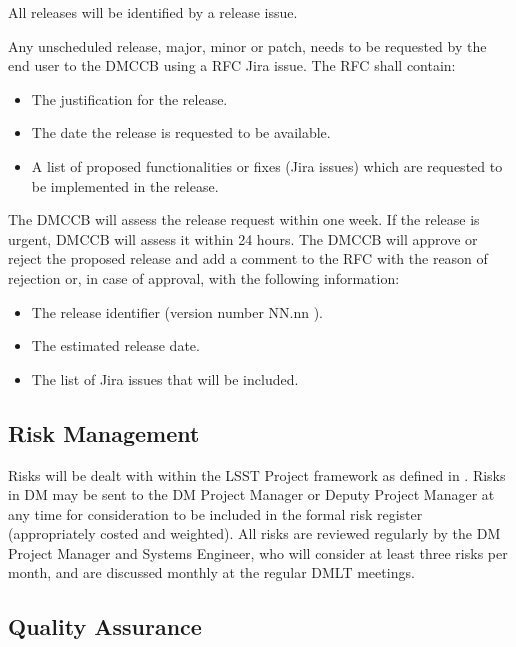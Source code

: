 All releases will be identified by a release issue.

Any unscheduled release, major, minor or \gls{patch}, needs to be requested by the end user to the \gls{DMCCB} using a \gls{RFC} Jira issue. The \gls{RFC} shall contain:

\begin{itemize}
\item The justification for the release.
\item The date the release is requested to be available.
\item A list of proposed functionalities or fixes (Jira issues) which are requested to be implemented in the release.
\end{itemize}

The \gls{DMCCB} will assess the release request within one week. If the release is urgent, \gls{DMCCB} will assess it within 24 hours.
The \gls{DMCCB} will approve or reject the proposed release and add a comment to the \gls{RFC} with the reason of rejection or, in case of approval, with the following information:

\begin{itemize}
\item The release identifier (version number NN.nn ).
\item The estimated release date.
\item The list of Jira issues that will be included.
\end{itemize}


\subsection {Risk Management } \label{sect:risk}

Risks will be dealt with within the \gls{LSST} Project framework as defined in .
Risks in \gls{DM} may be sent to the \gls{DM} \gls{Project Manager} or Deputy \gls{Project Manager} at any time for consideration to be included in the formal risk register (appropriately costed and weighted).
All risks are reviewed regularly by the \gls{DM} \gls{Project Manager} and \gls{Systems Engineer}, who will consider at least three risks per month, and are discussed monthly at the regular \gls{DMLT} meetings.


\subsection {Quality Assurance  } \label{sect:pa}

